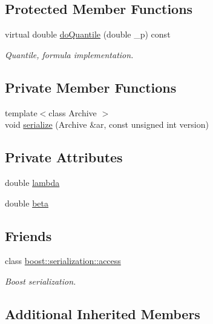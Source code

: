 \subsection*{Protected Member Functions}
\begin{DoxyCompactItemize}
\item 
virtual double \hyperlink{class_c_exponential_c_r_v_a8e3834ea830000f7a7e76e3a7014fbad}{do\-Quantile} (double \-\_\-p) const 
\begin{DoxyCompactList}\small\item\em Quantile, formula implementation. \end{DoxyCompactList}\end{DoxyCompactItemize}
\subsection*{Private Member Functions}
\begin{DoxyCompactItemize}
\item 
{\footnotesize template$<$class Archive $>$ }\\void \hyperlink{class_c_exponential_c_r_v_abcfcc36fab68eefb9c52f64d55fc472f}{serialize} (Archive \&ar, const unsigned int version)
\end{DoxyCompactItemize}
\subsection*{Private Attributes}
\begin{DoxyCompactItemize}
\item 
double \hyperlink{class_c_exponential_c_r_v_a4bae65d53141f778e4a324f70c4658b1}{lambda}
\item 
double \hyperlink{class_c_exponential_c_r_v_a29435872622b1a114b3c5c3717239fd2}{beta}
\end{DoxyCompactItemize}
\subsection*{Friends}
\begin{DoxyCompactItemize}
\item 
class \hyperlink{class_c_exponential_c_r_v_ac98d07dd8f7b70e16ccb9a01abf56b9c}{boost\-::serialization\-::access}
\begin{DoxyCompactList}\small\item\em Boost serialization. \end{DoxyCompactList}\end{DoxyCompactItemize}
\subsection*{Additional Inherited Members}


